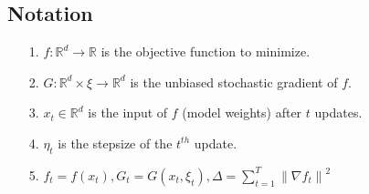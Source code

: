 \documentclass[14pt,onecolumn,letterpaper]{extarticle}
\begin{document}
\subsection{Notation}
\begin{enumerate}
    \item [1.] $f:\mathbb{R}^d \rightarrow \mathbb{R}$ is the objective function to minimize.
    \item [2.] $G:\mathbb{R}^d \times \xi \rightarrow \mathbb{R}^d$ is the unbiased stochastic gradient of $f$.
    \item [3.] $x_t\in \mathbb{R}^d$ is the input of $f$ (model weights) after $t$ updates.
    \item [4.] $\eta_t$ is the stepsize of the $t^{th}$ update.
    \item [5.] $f_t=f(x_t),G_t=G(x_t,\xi_t),\Delta=\sum_{t=1}^T\left\|\nabla f_t\right\|^2$
\end{enumerate}
\end{document}
